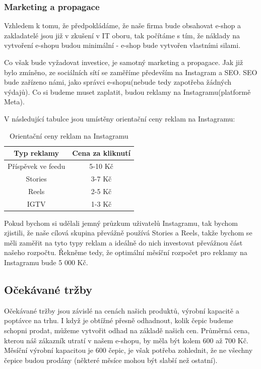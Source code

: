 \documentclass[12pt, a4paper]{article}
\begin{document}
\subsubsection{Marketing a propagace}

Vzhledem k tomu, že předpokládáme, že naše firma bude obsahovat e-shop a
zakladatelé jsou již v zkušení v IT oboru, tak
počítáme s tím, že náklady na vytvoření e-shopu budou minimální - e-shop
bude vytvořen vlastními silami.

\vspace{10pt}
\noindent Co však bude vyžadovat investice, je samotný marketing a propagace.
Jak již bylo zmíněno, ze sociálních sítí se zaměříme především na Instagram a SEO.
SEO bude zařízeno námi, jako správci e-shopu(nebude tedy zapotřeba žádných výdajů). Co si budeme
muset zaplatit, budou reklamy na Instagramu(platformě Meta).

\noindent V následující tabulce jsou umístěny orientační ceny reklam na Instagramu:

\begin{table}[h]
  \centering
  \begin{tabular}{ |c|c| }
    \hline
    \textbf{Typ reklamy} & \textbf{Cena za kliknutí} \\
    \hline
    \hline
    Příspěvek ve feedu & 5-10 Kč \\
    \hline
    Stories & 3-7 Kč \\
    \hline
    Reels & 2-5 Kč \\
    \hline
    IGTV & 1-3 Kč \\
    \hline
  \end{tabular}
  \caption{Orientační ceny reklam na Instagramu \cite{reklamy-ig-zoomstudio}}
\end{table}

\noindent Pokud bychom si udělali jemný průzkum uživatelů Instagramu, tak bychom zjistili, že
naše cílová skupina převážně používá Stories a Reels, takže bychom se měli zaměřit na tyto typy reklam
a ideálně do nich investovat převážnou část našeho rozpočtu. Řekněme tedy, že optimální měsíční
rozpočet pro reklamy na Instagramu bude 5 000 Kč.

\subsection{Očekávané tržby}

Očekávané tržby jsou závislé na cenách našich produktů, výrobní kapacitě a poptávce na trhu.
I když je obtížné přesně odhadnout, kolik čepic budeme schopni prodat, můžeme vytvořit odhad na základě našich cen.
Průměrná cena, kterou náš zákazník utratí v našem e-shopu, by měla být kolem 600 až 700 Kč.
Měsíční výrobní kapacitou je 600 čepic, je však potřeba zohlednit, že ne všechny čepice budou prodány
(některé měsíce mohou být slabší než ostatní).
\end{document}
